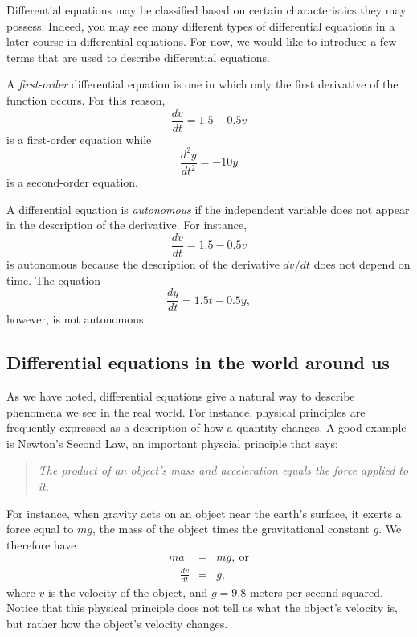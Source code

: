 
Differential equations may be classified based on certain characteristics they may possess.  Indeed, you may see many different types of differential equations in a later course in differential equations.  For now, we would like to introduce a few terms that are used to describe differential equations.

A {\em first-order} differential equation is one in which only the first derivative of the function occurs.  For this reason,
$$ \frac{dv}{dt} = 1.5-0.5v $$
is a first-order equation while
$$ \frac{d^2 y}{dt^2} = -10y $$
is a second-order equation.

A differential equation is {\em autonomous}  if the independent variable does not  appear in the description of the derivative.  For instance,
$$ \frac{dv}{dt} = 1.5-0.5v $$
is autonomous because the description of the derivative $dv/dt$ does not depend on time.   The equation
$$ \frac{dy}{dt} = 1.5t - 0.5y, $$
however, is not autonomous.

\subsection*{Differential equations in the world around us}

As we have noted, differential equations give a natural way to describe phenomena we see in the real world.  For instance, physical principles are frequently expressed as a description of how a quantity changes.  A good example is Newton's Second Law, an important physcial principle that says:  

\begin{quote} {\em The product of an object's mass and acceleration equals the force applied to it.} \end{quote}

For instance, when gravity acts on an object near the earth's surface, it exerts a force equal to $mg$, the mass of the object times the gravitational constant $g$.  We therefore have 
\begin{eqnarray*} 
ma & = & mg, \ \mbox{or} \\
\quad \frac{dv}{dt} & = & g,
\end{eqnarray*}
where $v$ is the velocity of the object, and $g = 9.8$ meters per second squared.  Notice that this physical principle does not tell us what the object's velocity is, but rather how the object's velocity changes.  

